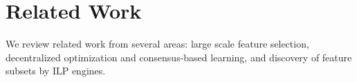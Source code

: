 
\section{Related Work}
\label{sec:related}
We review related work from several areas: large scale feature selection, decentralized
optimization and consensus-based learning, and discovery of feature subsets by ILP engines.

